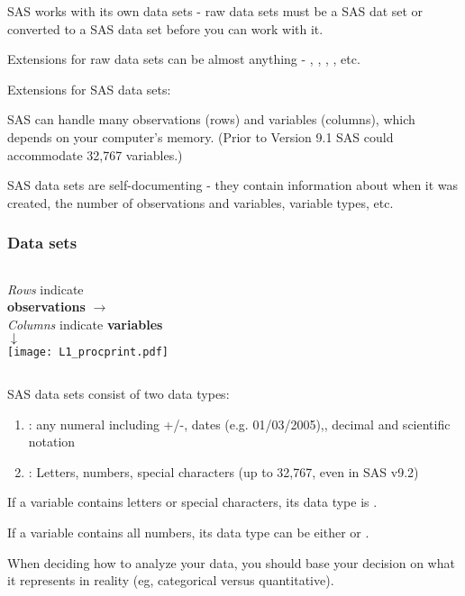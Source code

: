 \begin{frame}
\bi
\item SAS works with its own data sets - raw data sets must be a SAS dat set or converted to a SAS data set before you can work with it.
\item Extensions for raw data sets can be almost anything - , , , , etc.
\item Extensions for SAS data sets:   
\item SAS can handle many observations (rows) and variables (columns), which depends on your computer's memory.  (Prior to Version 9.1 SAS could accommodate 32,767 variables.)
\item SAS data sets are self-documenting - they contain information about when it was created, the number of observations and variables, variable types, etc.

\ei
\end{frame}


\begin{frame}
\frametitle{Data sets}
\begin{columns}
\emph{Rows} indicate  \\
\textbf{observations} $\rightarrow$\\
\hspace{0.5in} \textit{Columns} indicate \textbf{variables} \\
\hspace{1.3in}$\downarrow$ \\
\vskip10pt
\texttt{[image: L1\_procprint.pdf]}
\end{columns}
\vskip10pt
SAS data sets consist of two data types:
\begin{enumerate}
    \item {}: any numeral including +/-, dates (e.g. 01/03/2005),, decimal and scientific notation
    \item {}: Letters, numbers, special characters (up to 32,767, even in SAS v9.2)
\end{enumerate}
\end{frame}

\begin{frame}
\bi
 \item If a variable contains letters or special characters, its data type is .
 \item If a variable contains all numbers, its data type can be either  or .
 \item When deciding how to analyze your data, you should base your decision on what it represents in reality (eg, categorical versus quantitative).
\ei
\end{frame}

